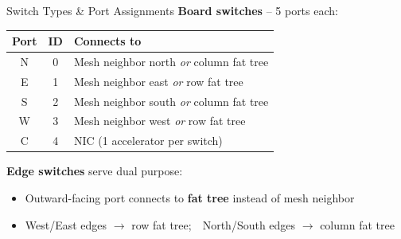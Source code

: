 \documentclass[t]{beamer}
\begin{document}
\begin{frame}{Switch Types \& Port Assignments}
    \textbf{Board switches} -- 5 ports each:

    \vspace{0.2cm}

    \begin{tabular}{ccl}
        \toprule
        \textbf{Port} & \textbf{ID} & \textbf{Connects to} \\
        \midrule
        N & 0 & Mesh neighbor north \textit{or} column fat tree \\
        E & 1 & Mesh neighbor east \textit{or} row fat tree \\
        S & 2 & Mesh neighbor south \textit{or} column fat tree \\
        W & 3 & Mesh neighbor west \textit{or} row fat tree \\
        C & 4 & NIC (1 accelerator per switch) \\
        \bottomrule
    \end{tabular}

    \vspace{0.3cm}

    \textbf{Edge switches} serve dual purpose:
    \begin{itemize}
        \item Outward-facing port connects to \textbf{fat tree} instead of mesh neighbor
        \item West/East edges $\to$ row fat tree;~~North/South edges $\to$ column fat tree
    \end{itemize}
\end{frame}
\end{document}
